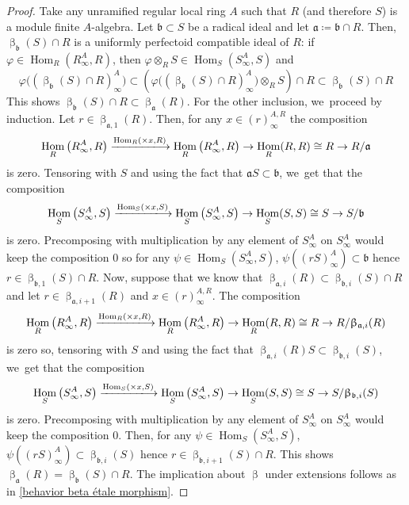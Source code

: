 \documentclass[11pt]{article}
\let\autoref\cref
\theoremstyle{plain}
\theoremstyle{definition}
\numberwithin{equation}{theorem}
\let\tensor\otimes
\newcommand{\fra}{\mathfrak{a}}
\newcommand{\frab}{\mathfrak{b}}
\DeclareMathOperator{\Hom}{Hom}
\renewcommand{\phi}{\varphi}
\newcommand{\rafty}{R^A_\infty}
\newcommand{\safty}{S^A_\infty}
\begin{document}
\begin{proof}
Take any unramified regular local ring $A$ such that $R$ (and therefore $S$) is a module finite $A$-algebra. Let $\frab\subset S$ be a radical ideal and let $\fra\coloneqq \frab\cap R$. Then, $\upbeta_\frab(S) \cap R$ is a uniformly perfectoid compatible ideal of $R$: if $\phi\in \Hom_R(\rafty,R)$, then $\phi\tensor_R S\in \Hom_S(\safty,S)$ and\vspace*{-3pt}
\[
\phi\bigl(\left(\upbeta_\frab(S)\cap R\right)^A_\infty\bigl)\subset \left(\phi\bigl(\left(\upbeta_\frab(S)\cap R\right)^A_\infty\bigr)\tensor_R S\right)\cap R \subset \upbeta_\frab(S)\cap R
\]
This shows $\upbeta_\frab(S)\cap R\subset \upbeta_\fra(R)$. For the other inclusion, we~proceed by induction. Let $r\in \upbeta_{\fra,1}(R)$. Then, for any $x\in (r)^{A, R}_\infty$ the composition\vspace*{-3pt}
\[
\Hom_R\left(\rafty,R\right)\xlongrightarrow{\Hom_R(\times x, R)}\Hom_R\left(\rafty,R\right) \to \Hom_R(R,R)\cong R \to R/\fra
\]
is zero. Tensoring with $S$ and using the fact that $\fra S\subset \frab$, we~get that the composition\vspace*{-3pt}
\[
\Hom_S\left(\safty,S\right)\xlongrightarrow{\Hom_S(\times x, S)}\Hom_S\left(\safty,S\right) \to \Hom_S(S,S)\cong S \to S/\frab
\]
is zero. Precomposing with multiplication by any element of $\safty$ on $\safty$ would keep the composition $0$ so for any $\psi\in \Hom_S(\safty,S)$, $\psi((rS)^A_\infty)\subset \frab$ hence $r\in \upbeta_{\frab,1} (S) \cap R$. Now, suppose that we know that $\upbeta_{\fra,i}(R)\subset \upbeta_{\frab,i} (S)\cap R$ and let $r\in \upbeta_{\fra,i+1}(R)$ and $x \in (r)^{A,R}_\infty$.
The composition\vspace*{-3pt}
\[
\Hom_R\left(\rafty,R\right)\xlongrightarrow{\Hom_R(\times x, R)}\Hom_R\left(\rafty,R\right) \to \Hom_R(R,R)\cong R \to R/\upbeta_{\fra,i}(R)
\]
is zero so, tensoring with $S$ and using the fact that $\upbeta_{\fra,i}(R) S\subset \upbeta_{\frab,i}(S)$, we~get that the composition\vspace*{-3pt}
\[
\Hom_S\left(\safty,S\right)\xlongrightarrow{\Hom_S(\times x, S)}\Hom_S\left(\safty,S\right) \to \Hom_S(S,S)\cong S \to S/\upbeta_{\frab,i}(S)
\]
is zero. Precomposing with multiplication by any element of $\safty$ on $\safty$ would keep the composition $0$. Then, for any $\psi\in \Hom_S(\safty,S)$, $\psi((rS)^A_\infty)\subset \upbeta_{\frab,i}(S)$ hence $r\in \upbeta_{\frab,i+1} (S) \cap R$. This shows $\upbeta_\fra(R)=\upbeta_\frab(S)\cap R$.
The implication about $\upbeta$ under extensions follows as in \autoref{behavior beta étale morphism}.
\end{proof}
\end{document}
